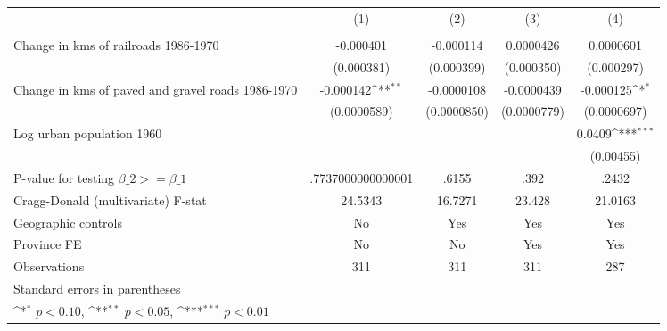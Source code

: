 {
\def\sym#1{\ifmmode^{#1}\else\(^{#1}\)\fi}
\begin{tabular}{l*{4}{c}}
\hline\hline
                &\multicolumn{1}{c}{(1)}&\multicolumn{1}{c}{(2)}&\multicolumn{1}{c}{(3)}&\multicolumn{1}{c}{(4)}\\
                &\multicolumn{1}{c}{}&\multicolumn{1}{c}{}&\multicolumn{1}{c}{}&\multicolumn{1}{c}{}\\
\hline
Change in kms of railroads 1986-1970&-0.000401         &-0.000114         &0.0000426         &0.0000601         \\
                &(0.000381)         &(0.000399)         &(0.000350)         &(0.000297)         \\
[1em]
Change in kms of paved and gravel roads 1986-1970&-0.000142\sym{**} &-0.0000108         &-0.0000439         &-0.000125\sym{*}  \\
                &(0.0000589)         &(0.0000850)         &(0.0000779)         &(0.0000697)         \\
[1em]
Log urban population 1960&                  &                  &                  &   0.0409\sym{***}\\
                &                  &                  &                  &(0.00455)         \\
\hline
P-value for testing $\beta\_{2} >= \beta\_{1}$&.7737000000000001         &    .6155         &     .392         &    .2432         \\
Cragg-Donald (multivariate) F-stat&  24.5343         &  16.7271         &   23.428         &  21.0163         \\
Geographic controls&       No         &      Yes         &      Yes         &      Yes         \\
Province FE     &       No         &       No         &      Yes         &      Yes         \\
Observations    &      311         &      311         &      311         &      287         \\
\hline\hline
\multicolumn{5}{l}{\footnotesize Standard errors in parentheses}\\
\multicolumn{5}{l}{\footnotesize \sym{*} \(p<0.10\), \sym{**} \(p<0.05\), \sym{***} \(p<0.01\)}\\
\end{tabular}
}

